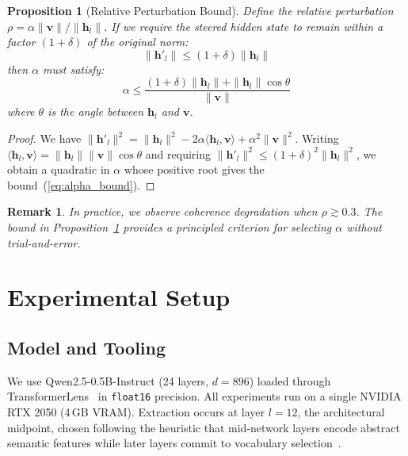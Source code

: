 \documentclass[journal, onecolumn]{IEEEtran}
\newtheorem{proposition}{Proposition}
\newtheorem{remark}{Remark}
\begin{document}
\begin{proposition}[Relative Perturbation Bound]
\label{prop:bound}
Define the relative perturbation $\rho = \alpha\|\bm{v}\| / \|\bm{h}_l\|$. If we require the steered hidden state to remain within a factor $(1+\delta)$ of the original norm:
\begin{equation}
    \|\bm{h}'_l\| \leq (1+\delta)\|\bm{h}_l\|
\end{equation}
then $\alpha$ must satisfy:
\begin{equation}
    \alpha \leq \frac{(1+\delta)\|\bm{h}_l\| + \|\bm{h}_l\| \cos\theta}{\|\bm{v}\|}
    \label{eq:alpha_bound}
\end{equation}
where $\theta$ is the angle between $\bm{h}_l$ and $\bm{v}$.
\end{proposition}
\begin{proof}
We have $\|\bm{h}'_l\|^2 = \|\bm{h}_l\|^2 - 2\alpha\langle \bm{h}_l, \bm{v}\rangle + \alpha^2\|\bm{v}\|^2$. Writing $\langle \bm{h}_l, \bm{v}\rangle = \|\bm{h}_l\|\|\bm{v}\|\cos\theta$ and requiring $\|\bm{h}'_l\|^2 \leq (1+\delta)^2\|\bm{h}_l\|^2$, we obtain a quadratic in $\alpha$ whose positive root gives the bound~(\ref{eq:alpha_bound}).
\end{proof}

\begin{remark}
In practice, we observe coherence degradation when $\rho \gtrsim 0.3$. The bound in Proposition~\ref{prop:bound} provides a principled criterion for selecting $\alpha$ without trial-and-error.
\end{remark}

\section{Experimental Setup}
\label{sec:method}

\subsection{Model and Tooling}
We use Qwen2.5-0.5B-Instruct (24 layers, $d = 896$) loaded through TransformerLens~\cite{nanda2022} in \texttt{float16} precision. All experiments run on a single NVIDIA RTX 2050 (4\,GB VRAM). Extraction occurs at layer $l = 12$, the architectural midpoint, chosen following the heuristic that mid-network layers encode abstract semantic features while later layers commit to vocabulary selection~\cite{elhage2022}.
\end{document}
